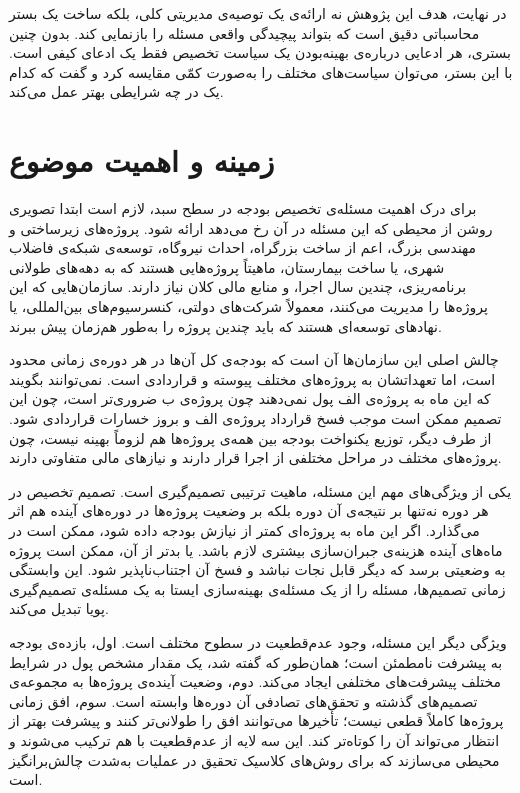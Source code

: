 در نهایت، هدف این پژوهش نه ارائه‌ی یک توصیه‌ی مدیریتی کلی، بلکه
ساخت یک بستر محاسباتی دقیق است که بتواند پیچیدگی واقعی مسئله را
بازنمایی کند. بدون چنین بستری، هر ادعایی درباره‌ی بهینه‌بودن یک
سیاست تخصیص فقط یک ادعای کیفی است. با این بستر، می‌توان سیاست‌های
مختلف را به‌صورت کمّی مقایسه کرد و گفت که کدام یک در چه شرایطی
بهتر عمل می‌کند.

\section{زمینه و اهمیت موضوع}
\label{sec:context}

برای درک اهمیت مسئله‌ی تخصیص بودجه در سطح سبد، لازم است ابتدا
تصویری روشن از محیطی که این مسئله در آن رخ می‌دهد ارائه شود.
پروژه‌های زیرساختی و مهندسی بزرگ، اعم از ساخت بزرگراه، احداث
نیروگاه، توسعه‌ی شبکه‌ی فاضلاب شهری، یا ساخت بیمارستان، ماهیتاً
پروژه‌هایی هستند که به دهه‌های طولانی برنامه‌ریزی، چندین سال اجرا،
و منابع مالی کلان نیاز دارند. سازمان‌هایی که این پروژه‌ها را مدیریت
می‌کنند، معمولاً شرکت‌های دولتی، کنسرسیوم‌های بین‌المللی، یا نهادهای
توسعه‌ای هستند که باید چندین پروژه را به‌طور هم‌زمان پیش ببرند.

چالش اصلی این سازمان‌ها آن است که بودجه‌ی کل آن‌ها در هر دوره‌ی
زمانی محدود است، اما تعهداتشان به پروژه‌های مختلف پیوسته و قراردادی
است. نمی‌توانند بگویند که این ماه به پروژه‌ی الف پول نمی‌دهند چون
پروژه‌ی ب ضروری‌تر است، چون این تصمیم ممکن است موجب فسخ قرارداد
پروژه‌ی الف و بروز خسارات قراردادی شود. از طرف دیگر، توزیع یکنواخت
بودجه بین همه‌ی پروژه‌ها هم لزوماً بهینه نیست، چون پروژه‌های مختلف
در مراحل مختلفی از اجرا قرار دارند و نیازهای مالی متفاوتی دارند.

یکی از ویژگی‌های مهم این مسئله، ماهیت ترتیبی تصمیم‌گیری است.
تصمیم تخصیص در هر دوره نه‌تنها بر نتیجه‌ی آن دوره بلکه بر وضعیت
پروژه‌ها در دوره‌های آینده هم اثر می‌گذارد. اگر این ماه به پروژه‌ای
کمتر از نیازش بودجه داده شود، ممکن است در ماه‌های آینده هزینه‌ی
جبران‌سازی بیشتری لازم باشد. یا بدتر از آن، ممکن است پروژه به
وضعیتی برسد که دیگر قابل نجات نباشد و فسخ آن اجتناب‌ناپذیر شود.
این وابستگی زمانی تصمیم‌ها، مسئله را از یک مسئله‌ی بهینه‌سازی
ایستا به یک مسئله‌ی تصمیم‌گیری پویا تبدیل می‌کند.

ویژگی دیگر این مسئله، وجود عدم‌قطعیت در سطوح مختلف است. اول،
بازده‌ی بودجه به پیشرفت نامطمئن است؛ همان‌طور که گفته شد، یک مقدار
مشخص پول در شرایط مختلف پیشرفت‌های مختلفی ایجاد می‌کند. دوم،
وضعیت آینده‌ی پروژه‌ها به مجموعه‌ی تصمیم‌های گذشته و تحقق‌های
تصادفی آن دوره‌ها وابسته است. سوم، افق زمانی پروژه‌ها کاملاً
قطعی نیست؛ تأخیرها می‌توانند افق را طولانی‌تر کنند و پیشرفت
بهتر از انتظار می‌تواند آن را کوتاه‌تر کند. این سه لایه از
عدم‌قطعیت با هم ترکیب می‌شوند و محیطی می‌سازند که برای روش‌های
کلاسیک تحقیق در عملیات به‌شدت چالش‌برانگیز است.

